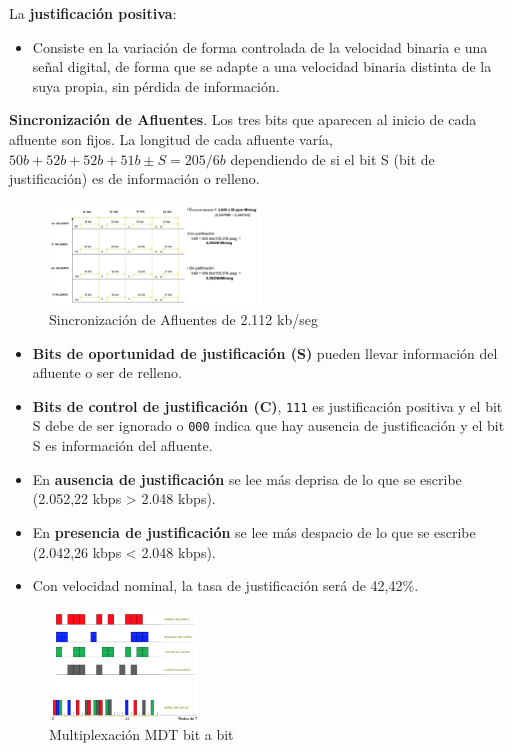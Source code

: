 \documentclass[10pt,portrait, twocolumn]{article}
\begin{document}
La \textbf{justificación positiva}:

	\begin{itemize}
		\item Consiste en la variación de forma controlada de la velocidad binaria e una señal digital, de forma que se adapte a una velocidad binaria distinta de la suya propia, sin pérdida de información.
	\end{itemize}



\textbf{Sincronización de Afluentes}. Los tres bits que aparecen al inicio de cada afluente son fijos. La longitud de cada afluente varía, $50b + 52b + 52b + 51b \pm S = 205/6b$ dependiendo de si el bit S (bit de justificación) es de información o relleno.\\

\begin{figure}[!ht]
	\centering
     \includegraphics[width=0.5\textwidth]{sync}
      \caption{Sincronización de Afluentes de 2.112 kb/seg}
      \label{fig:Regiones de frecuencias}
  \end{figure}
  
\begin{itemize}
\item \textbf{Bits de oportunidad de justificación (S)} pueden llevar información del afluente o ser de relleno. 
\item \textbf{Bits de control de justificación (C)}, \texttt{111} es justificación positiva y el bit S debe de ser ignorado o \texttt{000} indica que hay ausencia de justificación y el bit S es información del afluente.
\item En \textbf{ausencia de justificación} se lee más deprisa de lo que se escribe (2.052,22 kbps > 2.048 kbps).
\item En \textbf{presencia de justificación} se lee más despacio de lo que se escribe (2.042,26 kbps < 2.048 kbps). 
\item Con velocidad nominal, la tasa de justificación será de 42,42\%.
\end{itemize}
  


\begin{figure}[!ht]
	\centering
     \includegraphics[width=0.35\textwidth]{MDT}
      \caption{Multiplexación MDT bit a bit}
      \label{fig:Regiones de frecuencias}
  \end{figure}
  
\end{document}

